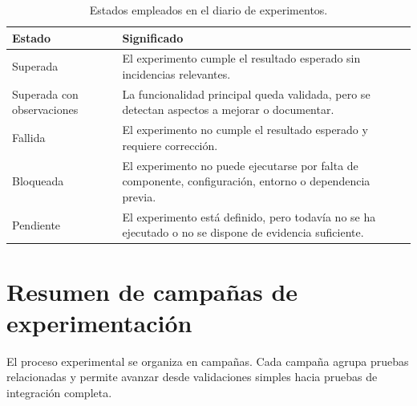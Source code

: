 \begin{table}[H]
\centering
\renewcommand{\arraystretch}{1.25}
\small
\begin{tabular}{|p{}|p{}|}
\hline
\rowcolor{gray!20}
\textbf{Estado} & \textbf{Significado} \\
\hline
Superada & El experimento cumple el resultado esperado sin incidencias relevantes. \\
\hline
Superada con observaciones & La funcionalidad principal queda validada, pero se detectan aspectos a mejorar o documentar. \\
\hline
Fallida & El experimento no cumple el resultado esperado y requiere corrección. \\
\hline
Bloqueada & El experimento no puede ejecutarse por falta de componente, configuración, entorno o dependencia previa. \\
\hline
Pendiente & El experimento está definido, pero todavía no se ha ejecutado o no se dispone de evidencia suficiente. \\
\hline
\end{tabular}
\caption{Estados empleados en el diario de experimentos.}
\label{tab:estados_diario_experimentos}
\end{table}

\section{Resumen de campañas de experimentación}

El proceso experimental se organiza en campañas. Cada campaña agrupa pruebas relacionadas y permite avanzar desde validaciones simples hacia pruebas de integración completa.

